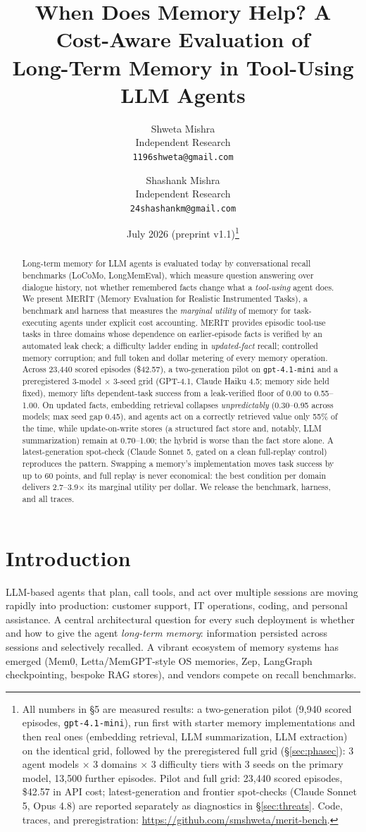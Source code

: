 \documentclass[11pt]{article}
\title{When Does Memory Help? A Cost-Aware Evaluation of\\
Long-Term Memory in Tool-Using LLM Agents}
\author{Shweta Mishra\\
Independent Research\\
\texttt{1196shweta@gmail.com}
\and
Shashank Mishra\\
Independent Research\\
\texttt{24shashankm@gmail.com}}
\date{July 2026 (preprint v1.1)\thanks{All numbers in \S5 are measured
results: a two-generation pilot (9{,}940 scored episodes,
\texttt{gpt-4.1-mini}), run first with starter memory implementations and then real ones
(embedding retrieval, LLM summarization, LLM extraction) on the identical
grid, followed by the preregistered full grid (\S\ref{sec:phasec}):
3 agent models $\times$ 3 domains $\times$ 3 difficulty tiers with 3 seeds
on the primary model, 13{,}500 further episodes. Pilot and full grid:
23{,}440 scored episodes, \$42.57 in API cost; latest-generation and
frontier spot-checks (Claude Sonnet 5, Opus 4.8) are reported separately
as diagnostics in \S\ref{sec:threats}.
Code, traces, and preregistration: \url{https://github.com/smshweta/merit-bench}.}}
\newcommand{\merit}{\textsc{MERIT}}
\begin{document}
\maketitle

\begin{abstract}
Long-term memory for LLM agents is evaluated today by conversational
recall benchmarks (LoCoMo, LongMemEval), which measure question answering
over dialogue history, not whether remembered facts change what a
\emph{tool-using} agent does. We present \merit{} (Memory Evaluation for
Realistic Instrumented Tasks), a benchmark and harness that measures the
\emph{marginal utility} of memory for task-executing agents under explicit
cost accounting. \merit{} provides episodic tool-use tasks in three
domains whose dependence on earlier-episode facts is verified by an
automated leak check; a difficulty ladder ending in \emph{updated-fact}
recall; controlled memory corruption; and full token and dollar metering
of every memory operation. Across 23{,}440 scored episodes (\$42.57), a
two-generation pilot on \texttt{gpt-4.1-mini} and a preregistered 3-model
$\times$ 3-seed grid (GPT-4.1, Claude Haiku 4.5; memory side held fixed),
memory lifts dependent-task success from a leak-verified floor of 0.00 to
0.55--1.00. On updated facts, embedding retrieval collapses
\emph{unpredictably} (0.30--0.95 across models; max seed gap 0.45), and
agents act on a correctly retrieved value only 55\% of the time, while
update-on-write stores (a structured fact store and, notably, LLM
summarization) remain at 0.70--1.00; the hybrid is worse than the fact
store alone. A latest-generation spot-check (Claude Sonnet 5, gated on a
clean full-replay control) reproduces the pattern. Swapping a memory's
implementation moves task success by up to 60 points, and full replay is
never economical: the best condition per domain delivers
2.7--3.9$\times$ its marginal utility per dollar. We release the
benchmark, harness, and all traces.
\end{abstract}

\section{Introduction}

LLM-based agents that plan, call tools, and act over multiple sessions are
moving rapidly into production: customer support, IT operations, coding, and
personal assistance. A central architectural question for every such
deployment is whether and how to give the agent \emph{long-term memory}:
information persisted across sessions and selectively recalled. A vibrant
ecosystem of memory systems has emerged (Mem0, Letta/MemGPT-style OS
memories, Zep, LangGraph checkpointing, bespoke RAG stores), and vendors
compete on recall benchmarks.
\end{document}
